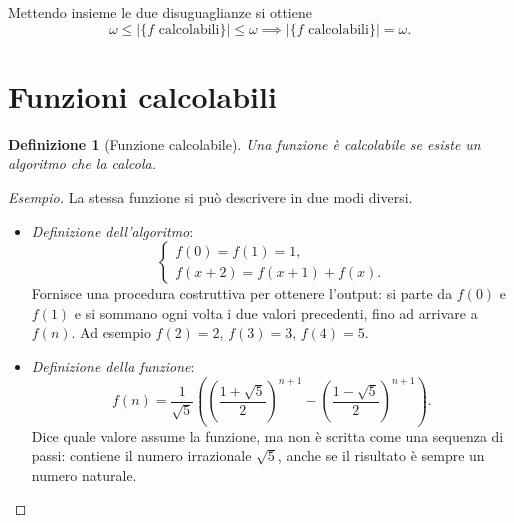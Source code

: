 \documentclass[a4paper, 11pt, oneside]{book}
\theoremstyle{formale}
\newtheorem*{definition}{Definizione}
\newenvironment{esempio}
    {\begin{proof}[\textit{Esempio}]\renewcommand{\qedsymbol}{$\diamond$}}
    {\end{proof}}
\begin{document}
    Mettendo insieme le due disuguaglianze si ottiene
    \begin{equation*}
        \omega \leq |\{f \text{ calcolabili}\}| \leq \omega
        \implies
        |\{f \text{ calcolabili}\}| = \omega.
    \end{equation*}

    \section{Funzioni calcolabili}
    \label{sec:tesi-church}
    \begin{definition}[Funzione calcolabile]
        Una funzione \`e \emph{calcolabile} se esiste un algoritmo che la calcola.
    \end{definition}

    \begin{esempio}
        La stessa funzione si pu\`o descrivere in due modi diversi.
        \begin{itemize}
            \item \emph{Definizione dell'algoritmo}:
                \begin{equation*}
                    \begin{cases}
                        f(0) = f(1) = 1, \\
                        f(x + 2) = f(x + 1) + f(x).
                    \end{cases}
                \end{equation*}
                Fornisce una procedura costruttiva per ottenere l'output: si parte da
                $f(0)$ e $f(1)$ e si sommano ogni volta i due valori precedenti, fino ad
                arrivare a $f(n)$. Ad esempio $f(2) = 2$, $f(3) = 3$, $f(4) = 5$.
            \item \emph{Definizione della funzione}:
                \begin{equation*}
                    f(n) = \frac{1}{\sqrt{5}} \left( \left( \frac{1 + \sqrt{5}}{2}
                    \right)^{n+1} - \left( \frac{1 - \sqrt{5}}{2} \right)^{n+1} \right).
                \end{equation*}
                Dice quale valore assume la funzione, ma non \`e scritta come una
                sequenza di passi: contiene il numero irrazionale $\sqrt{5}$, anche se
                il risultato \`e sempre un numero naturale.\qedhere
        \end{itemize}
    \end{esempio}
\end{document}
